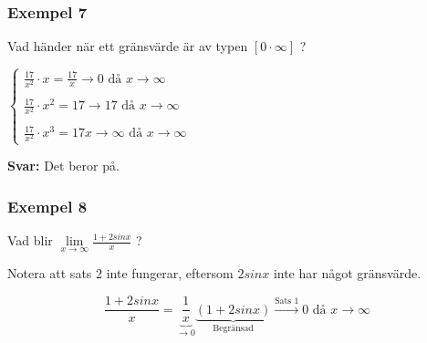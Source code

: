 \documentclass[swedish]{article}
\begin{document}
\subsubsection{Exempel 7}

Vad händer när ett gränsvärde är av typen $\left[ 0 \cdot \infty \right]$ ?

\bigbreak

$\left\{ \begin{array}{l}
    \frac{17}{x^2} \cdot x = \frac{17}{x} \to 0 \text{ då } x \to \infty\\
    \\
    \frac{17}{x^2} \cdot x^2 = 17 \to 17 \text{ då } x \to \infty\\ 
    \\
    \frac{17}{x^2} \cdot x^3 = 17x \to \infty \text{ då } x \to \infty
\end{array} \right.$

\bigbreak

\textbf{Svar: } Det beror på.

\subsubsection{Exempel 8}

Vad blir $\lim\limits_{x \to \infty} \frac{1 + 2sinx}{x}$ ?

\bigbreak

Notera att sats 2 inte fungerar, eftersom $2sinx$ inte har något gränsvärde. 

$$\frac{1+2sinx}{x} = \underbrace{\frac{1}{x}}_{\to 0} \underbrace{(1+2sinx)}_{\text{Begränsad}} \xrightarrow{\text{Sats 1}} 0 \text{ då } x \to \infty$$
\end{document}
